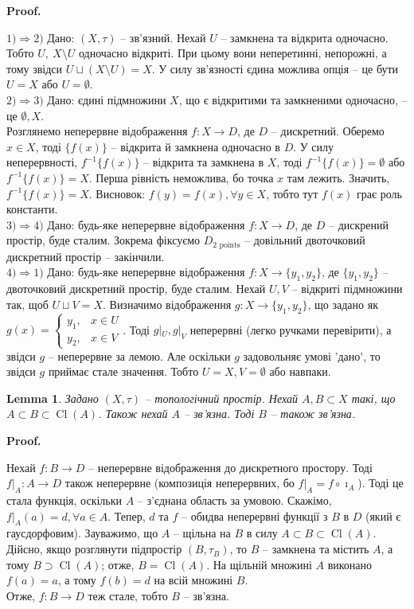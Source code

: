 \documentclass[a4paper, 10pt]{article}
\makeatletter
\theoremstyle{theoremdd}
\newtheorem{lemma}[theorem]{Lemma}
\DeclareMathOperator{\Cl}{Cl}
\renewenvironment{proof}[1][Proof.\\]{\par
\pushQED{\hfill \qed}%
\normalfont \topsep6\p@\@plus6\p@\relax
\trivlist
\item\relax
{\bfseries
#1\@addpunct{.}}\hspace\labelsep\ignorespaces
}{%
\popQED\endtrivlist\@endpefalse
}
\makeatother
\begin{document}
\begin{proof}
$\boxed{1) \Rightarrow 2)}$ Дано: $(X,\tau)$ -- зв'язний. Нехай $U$ -- замкнена та відкрита одночасно. Тобто $U,\ X \setminus U$ одночасно відкриті. При цьому вони неперетинні, непорожні, а тому звідси $U \sqcup (X \setminus U) = X$. У силу зв'язності єдина можлива опція -- це бути $U = X$ або $U = \emptyset$.
\bigskip \\
$\boxed{2) \Rightarrow 3)}$ Дано: єдині підмножини $X$, що є відкритими та замкненими одночасно, -- це $\emptyset, X$.\\
Розглянемо неперервне відображення $f \colon X \to D$, де $D$ -- дискретний. Оберемо $x \in X$, тоді $\{f(x)\}$ -- відкрита й замкнена одночасно в $D$. У силу неперервності, $f^{-1}\{f(x)\}$ -- відкрита та замкнена в $X$, тоді $f^{-1}\{f(x)\} = \emptyset$ або $f^{-1}\{f(x)\} = X$. Перша рівність неможлива, бо точка $x$ там лежить. Значить, $f^{-1}\{f(x)\} = X$. Висновок: $f(y) = f(x), \forall y \in X$, тобто тут $f(x)$ грає роль константи.
\bigskip \\
$\boxed{3) \Rightarrow 4)}$ Дано: будь-яке неперервне відображення $f \colon X \to D$, де $D$ -- дискрений простір, буде сталим. Зокрема фіксуємо $D_{2 \text{ points}}$ -- довільний двоточковий дискретний простір -- закінчили.
\bigskip \\
$\boxed{4) \Rightarrow 1)}$ Дано: будь-яке неперервне відображення $f \colon X \to \{y_1,y_2\}$, де $\{y_1,y_2\}$ -- двоточковий дискретний простір, буде сталим. Нехай $U,V$ -- відкриті підмножини так, щоб $U \sqcup V = X$. Визначимо відображення $g \colon X \to \{y_1,y_2\}$, що задано як $g(x) = \begin{cases} y_1, & x \in U \\ y_2, & x \in V \end{cases}$. Тоді $g|_U, g|_V$ неперервні (легко ручками перевірити), а звідси $g$ -- неперервне за лемою. Але оскільки $g$ задовольняє умові 'дано', то звідси $g$ приймає стале значення. Тобто $U = X, V = \emptyset$ або навпаки.
\end{proof}

\begin{lemma}
\label{connectedness_using_closure}
Задано $(X,\tau)$ -- топологічний простір. Нехай $A,B \subset X$ такі, що $A \subset B \subset \Cl(A)$. Також нехай $A$ -- зв'язна. Тоді $B$ -- також зв'язна.
\end{lemma}

\begin{proof}
Нехай $f \colon B \to D$ -- неперервне відображення до дискретного простору. Тоді $f|_A \colon A \to D$ також неперервне (композиція неперервних, бо $f|_A = f \circ \imath_A$). Тоді це стала функція, оскільки $A$ -- з'єднана область за умовою. Скажімо, $f|_A(a) = d, \forall a \in A$. Тепер, $d$ та $f$ -- обидва неперервні функції з $B$ в $D$ (який є гаусдорфовим). Зауважимо, що $A$ -- щільна на $B$ в силу $A \subset B \subset \Cl(A)$. Дійсно, якщо розглянути підпростір $(B,\tau_B)$, то $B$ -- замкнена та містить $A$, а тому $B \supset \Cl(A)$; отже, $B = \Cl(A)$. На щільній множині $A$ виконано $f(a) = a$, а тому $f(b) = d$ на всій множині $B$.\\
Отже, $f \colon B \to D$ теж стале, тобто $B$ -- зв'язна.
\end{proof}
\end{document}
